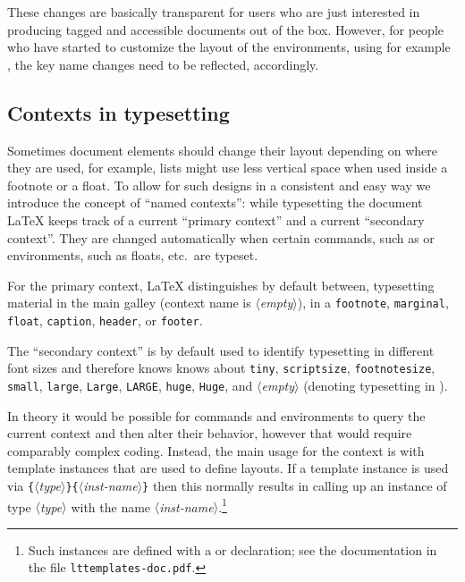 \documentclass{ltnews}
\providecommand\meta[1]{$\langle$\textrm{\itshape#1}$\rangle$}
\providecommand\Arg[1]{\texttt\{\meta{#1}\texttt\}}
\begin{document}
These changes are basically transparent for users who are just
interested in producing tagged and accessible documents out of the
box. However, for people who have started to customize the layout of the 
environments, using for example , the key
name changes need to be reflected, accordingly.


\subsection{Contexts in typesetting}

Sometimes document elements should change their layout depending on
where they are used, for example, lists might use less vertical space
when used inside a footnote or a float. To allow for such designs in a
consistent and easy way we introduce the concept of \enquote{named
  contexts}: while typesetting the document \LaTeX{} keeps track of a
current \enquote{primary context} and a current \enquote{secondary
  context}. They are changed automatically when certain commands, such
as  or environments, such as floats, etc.\ are typeset.

For the primary context, \LaTeX{} distinguishes by default between,
typesetting material in the main galley (context name is
\meta{empty}), in a \texttt{footnote}, \texttt{marginal},
\texttt{float}, \texttt{caption}, \texttt{header}, or \texttt{footer}.

The \enquote{secondary context} is by default used to identify
typesetting in different font sizes and therefore knows knows about
\texttt{tiny}, \texttt{scriptsize}, \texttt{footnotesize},
\texttt{small}, \texttt{large}, \texttt{Large}, \texttt{LARGE},
\texttt{huge}, \texttt{Huge}, and \meta{empty} (denoting typesetting
in ).

In theory it would be possible for commands and environments to query
the current context and then alter their behavior, however that would
require comparably complex coding. Instead, the main usage for the
context is with template instances that are used to define layouts.
If a template instance is used via
\Arg{type}\Arg{inst-name} then this normally results
in calling up an instance of type \meta{type} with the name
\meta{inst-name}.\footnote{Such instances are defined with a
 or  declaration; see the
documentation in the file \texttt{lttemplates-doc.pdf}.}
\end{document}
